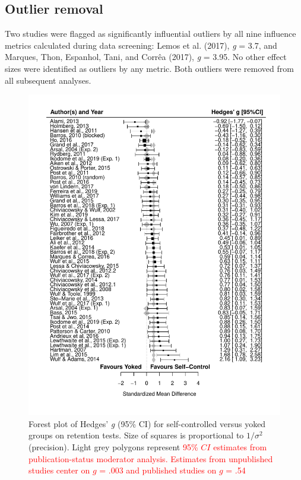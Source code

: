 \documentclass[
  english,
  man,floatsintext]{apa7}
\begin{document}
\hypertarget{outlier-removal}{%
\subsection{Outlier removal}\label{outlier-removal}}

Two studies were flagged as significantly influential outliers by all nine influence metrics calculated during data screening: Lemos et al. (2017), \emph{g} = 3.7, and Marques, Thon, Espanhol, Tani, and Corrêa (2017), \emph{g} = 3.95. No other effect sizes were identified as outliers by any metric. Both outliers were removed from all subsequent analyses.



\begin{figure}

{\centering \includegraphics[height=0.81\textheight]{../../figs/fig3} 

}

\caption{Forest plot of Hedges' \emph{g} (95\% CI) for self-controlled versus yoked groups on retention tests. Size of squares is proportional to \(1/\sigma^2\) (precision). Light grey polygons represent \textcolor{red}{95\% $CI$ estimates from publication-status moderator analysis. Estimates from unpublished studies center on $g$ = .003 and published studies on $g$ = .54}}\label{fig:fig3}
\end{figure}
\end{document}
